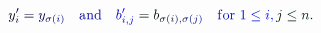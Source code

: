 \documentclass[12pt]{article}
\begin{document}
\makeatletter
\renewcommand*{\@textcolor}[3]{%
  \protect\leavevmode
  \begingroup
    \color#1{#2}#3%
  \endgroup
}
\makeatother
\begin{displaymath}
\mathcolor[RGB]{0,0,15}{y} _ { \mathcolor[RGB]{0,0,30}{i} } ^ { \mathcolor[RGB]{0,0,45}{\prime} } \mathcolor[RGB]{0,0,60}{=} \mathcolor[RGB]{0,0,75}{y} _ { \mathcolor[RGB]{0,0,90}{\sigma} \mathcolor[RGB]{0,0,105}{(} \mathcolor[RGB]{0,0,120}{i} \mathcolor[RGB]{0,0,135}{)} } \quad \mathrm { \mathcolor[RGB]{0,0,150}{a} \mathcolor[RGB]{0,0,165}{n} \mathcolor[RGB]{0,0,180}{d} } \quad \mathcolor[RGB]{0,0,195}{b} _ { \mathcolor[RGB]{0,0,210}{i} \mathcolor[RGB]{0,0,225}{,} \mathcolor[RGB]{0,0,240}{j} } ^ { \mathcolor[RGB]{0,0,255}{\prime} } \mathcolor[RGB]{0,15,0}{=} \mathcolor[RGB]{0,15,15}{b} _ { \mathcolor[RGB]{0,15,30}{\sigma} \mathcolor[RGB]{0,15,45}{(} \mathcolor[RGB]{0,15,60}{i} \mathcolor[RGB]{0,15,75}{)} \mathcolor[RGB]{0,15,90}{,} \mathcolor[RGB]{0,15,105}{\sigma} \mathcolor[RGB]{0,15,120}{(} \mathcolor[RGB]{0,15,135}{j} \mathcolor[RGB]{0,15,150}{)} } \quad \mathrm { \mathcolor[RGB]{0,15,165}{f} \mathcolor[RGB]{0,15,180}{o} \mathcolor[RGB]{0,15,195}{r} ~ } \mathcolor[RGB]{0,15,210}{1} \mathcolor[RGB]{0,15,225}{\leq} \mathcolor[RGB]{0,15,240}{i} \mathcolor[RGB]{0,15,255}{,} \mathcolor[RGB]{0,30,0}{j} \mathcolor[RGB]{0,30,15}{\leq} \mathcolor[RGB]{0,30,30}{n} \mathcolor[RGB]{0,30,45}{.}
\end{displaymath}
\end{document}
